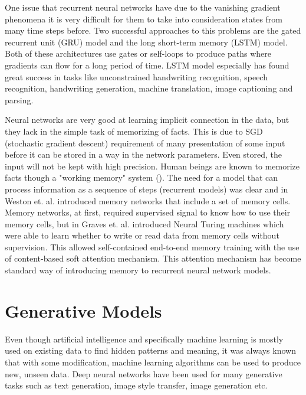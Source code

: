 \documentclass[b5paper]{book}
\let\cite\parencite
\begin{document}
One issue that recurrent neural networks have due to the vanishing gradient phenomena \cite{hochreiter1998vanishing} it is very difficult for them to take into consideration states from many time steps before. Two successful approaches to this problems are the gated recurrent unit (GRU) \cite{chung2014empirical} model and the long short-term memory (LSTM) \cite{hochreiter1997long} model. Both of these architectures use gates or self-loops to produce paths where gradients can flow for a long period of time. LSTM model especially has found great success in tasks like unconstrained handwriting recognition, speech recognition, handwriting generation, machine translation, image captioning and parsing. \cite{goodfellow2016deep}

Neural networks are very good at learning implicit connection in the data, but they lack in the simple task of memorizing of facts. This is due to SGD (stochastic gradient descent) requirement of many presentation of some input before it can be stored in a way in the network parameters. Even stored, the input will not be kept with high precision. Human beings are known to memorize facts though a "working memory" system (\cite{graves2014neural}). The need for a model that can process information as a sequence of steps (recurrent models) was clear and in \cite{weston2014memory} Weston et. al. introduced memory networks that include a set of memory cells. Memory networks, at first, required supervised signal to know how to use their memory cells, but in \cite{graves2014neural} Graves et. al. introduced Neural Turing machines \cite{graves2014neural} which were able to learn whether to write or read data from memory cells without supervision. This allowed self-contained end-to-end memory training with the use of content-based soft attention mechanism. This attention mechanism has become standard way of introducing memory to recurrent neural network models.

\section{Generative Models}

Even though artificial intelligence and specifically machine learning is mostly used on existing data to find hidden patterns and meaning, it was always known that with some modification, machine learning algorithms can be used to produce new, unseen data. Deep neural networks have been used for many generative tasks such as text generation, image style transfer, image generation etc. \cite{chollet2018deep}
\end{document}
